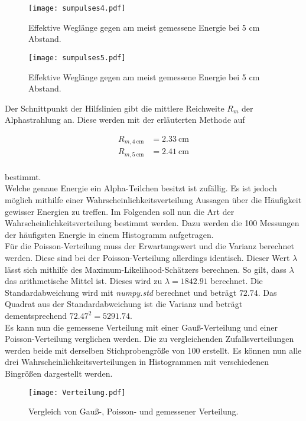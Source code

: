 \begin{figure}[H] 
    \texttt{[image: sumpulses4.pdf]}
    \caption{Effektive Weglänge gegen am meist gemessene Energie bei 5 cm Abstand.}
\end{figure}

\begin{figure}[H] 
    \texttt{[image: sumpulses5.pdf]}
    \caption{Effektive Weglänge gegen am meist gemessene Energie bei 5 cm Abstand.}
\end{figure}

\noindent Der Schnittpunkt der Hilfslinien gibt die mittlere Reichweite $R_m$ der 
Alphastrahlung an. Diese werden mit der erläuterten Methode auf 

\begin{align}
    R_{m, \qty{4}{\centi \meter}} &= \qty{2.33}{\centi \meter} \\
    R_{m, \qty{5}{\centi \meter}} &= \qty{2.41}{\centi \meter} \\
\end{align}

\noindent bestimmt.\\

\noindent Welche genaue Energie ein Alpha-Teilchen besitzt ist zufällig. Es ist jedoch möglich mithilfe einer 
Wahrscheinlichkeitsverteilung Aussagen über die Häufigkeit gewisser Energien zu treffen. Im Folgenden soll nun die Art 
der Wahrscheinlichkeitsverteilung bestimmt werden. Dazu werden die 100 Messungen der häufigsten Energie in einem 
Histogramm aufgetragen. \\
\noindent Für die Poisson-Verteilung muss der Erwartungswert und die Varianz berechnet werden. Diese sind bei der 
Poisson-Verteilung allerdings identisch. Dieser Wert $\lambda$ lässt sich mithilfe des Maximum-Likelihood-Schätzers 
berechnen. So gilt, dass $\lambda$ das arithmetische Mittel ist. Dieses wird zu $\lambda = 1842.91$ berechnet.
Die Standardabweichung wird mit \emph{numpy.std} berechnet und beträgt $72.74$. Das Quadrat aus der Standardabweichung ist 
die Varianz und beträgt dementsprechend $72.47^2 = 5291.74$. \\
\noindent Es kann nun die gemessene Verteilung mit einer Gauß-Verteilung und einer Poisson-Verteilung verglichen werden. 
Die zu vergleichenden Zufallsverteilungen werden beide mit derselben Stichprobengröße von 100 erstellt. Es können nun 
alle drei Wahrscheinlichkeitsverteilungen in Histogrammen mit verschiedenen Bingrößen dargestellt werden.

\begin{figure}
    \texttt{[image: Verteilung.pdf]}
    \caption{Vergleich von Gauß-, Poisson- und gemessener Verteilung.}
\end{figure}

%
